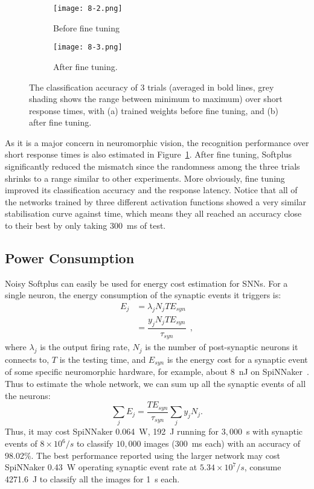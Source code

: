 \documentclass[runningheads,a4paper]{llncs}
\begin{document}
\begin{figure}[htb!]
	\centering
	\begin{subfigure}[t]{0.49\textwidth}
		\texttt{[image: 8-2.png]}
		\caption{Before fine tuning}
	\end{subfigure}
	\begin{subfigure}[t]{0.49\textwidth}
		\texttt{[image: 8-3.png]}
		\caption{After fine tuning.}
	\end{subfigure}
	
	\caption{The classification accuracy of 3 trials (averaged in bold lines, grey shading shows the range between minimum to maximum) over short response times, with (a) trained weights before fine tuning, and (b) after fine tuning.}
	\label{fig:ca_time}	
\end{figure}

As it is a major concern in neuromorphic vision, the recognition performance over short response times is also estimated in Figure~\ref{fig:ca_time}.
After fine tuning, Softplus significantly reduced the mismatch since the randomness among the three trials shrinks to a range similar to other experiments.
More obviously, fine tuning improved its classification accuracy and the response latency.
Notice that all of the networks trained by three different activation functions showed a very similar stabilisation curve against time, which means they all reached an accuracy close to their best by only taking 300~ms of test. 


\subsection{Power Consumption}
Noisy Softplus can easily be used for energy cost estimation for SNNs.
For a single neuron, the energy consumption of the synaptic events it triggers is:
\begin{equation}
\begin{aligned}
E_{j} &= \lambda_j N_j T E_{syn}\\
&= \dfrac{y_j N_j T E_{syn}}{\tau_{syn}}~~,
\end{aligned}
\label{equ:energy}
\end{equation}
where $\lambda_j$ is the output firing rate, $N_j$ is the number of post-synaptic neurons it connects to, $T$ is the testing time, and $E_{syn}$ is the energy cost for a synaptic event of some specific neuromorphic hardware, for example, about 8~nJ on SpiNNaker~\cite{stromatias2013power}.
Thus to estimate the whole network, we can sum up all the synaptic events of all the neurons:
\begin{equation}
\sum_j E_{j} =  \dfrac{T E_{syn}}{\tau_{syn}} \sum_{j}y_j N_j.
\end{equation}
Thus, it may cost SpiNNaker 0.064~W, 192~J running for $3,000$~s with synaptic events of $8\times10^6/s$ to classify $10,000$ images (300~ms each) with an accuracy of 98.02\%.
The best performance reported using the larger network may cost SpiNNaker 0.43~W operating synaptic event rate at $5.34\times10^7/s$, consume 4271.6~J to classify all the images for 1~s each.
\end{document}
